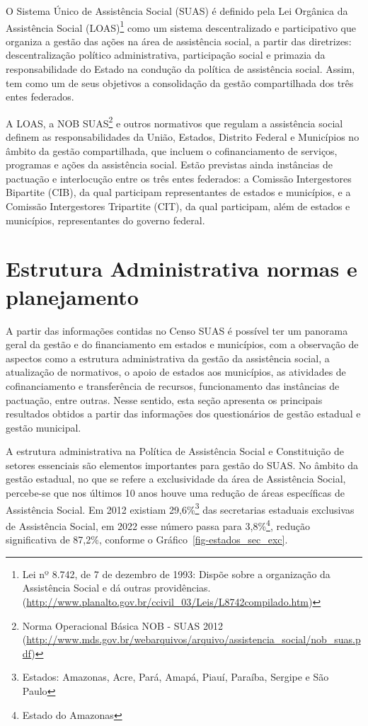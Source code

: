 \documentclass[
  letterpaper,
  DIV=11,
  numbers=noendperiod]{scrreprt}
\begin{document}
O Sistema Único de Assistência Social (SUAS) é definido pela Lei
Orgânica da Assistência Social (LOAS)\footnote{Lei nº 8.742, de 7 de
  dezembro de 1993: Dispõe sobre a organização da Assistência Social e
  dá outras providências.
  (\url{http://www.planalto.gov.br/ccivil_03/Leis/L8742compilado.htm})}
como um sistema descentralizado e participativo que organiza a gestão
das ações na área de assistência social, a partir das diretrizes:
descentralização político administrativa, participação social e primazia
da responsabilidade do Estado na condução da política de assistência
social. Assim, tem como um de seus objetivos a consolidação da gestão
compartilhada dos três entes federados.

A LOAS, a NOB SUAS\footnote{Norma Operacional Básica NOB - SUAS 2012
  (\url{http://www.mds.gov.br/webarquivos/arquivo/assistencia_social/nob_suas.pdf})}
e outros normativos que regulam a assistência social definem as
responsabilidades da União, Estados, Distrito Federal e Municípios no
âmbito da gestão compartilhada, que incluem o cofinanciamento de
serviços, programas e ações da assistência social. Estão previstas ainda
instâncias de pactuação e interlocução entre os três entes federados: a
Comissão Intergestores Bipartite (CIB), da qual participam
representantes de estados e municípios, e a Comissão Intergestores
Tripartite (CIT), da qual participam, além de estados e municípios,
representantes do governo federal.

\section{Estrutura Administrativa normas e
planejamento}\label{estrutura-administrativa-normas-e-planejamento}

A partir das informações contidas no Censo SUAS é possível ter um
panorama geral da gestão e do financiamento em estados e municípios, com
a observação de aspectos como a estrutura administrativa da gestão da
assistência social, a atualização de normativos, o apoio de estados aos
municípios, as atividades de cofinanciamento e transferência de
recursos, funcionamento das instâncias de pactuação, entre outras. Nesse
sentido, esta seção apresenta os principais resultados obtidos a partir
das informações dos questionários de gestão estadual e gestão municipal.

A estrutura administrativa na Política de Assistência Social e
Constituição de setores essenciais são elementos importantes para gestão
do SUAS. No âmbito da gestão estadual, no que se refere a exclusividade
da área de Assistência Social, percebe-se que nos últimos 10 anos houve
uma redução de áreas específicas de Assistência Social. Em 2012 existiam
29,6\%\footnote{Estados: Amazonas, Acre, Pará, Amapá, Piauí, Paraíba,
  Sergipe e São Paulo} das secretarias estaduais exclusivas de
Assistência Social, em 2022 esse número passa para 3,8\%\footnote{Estado
  do Amazonas}, redução significativa de 87,2\%, conforme o
Gráfico~\ref{fig-estados_sec_exc}.
\end{document}
